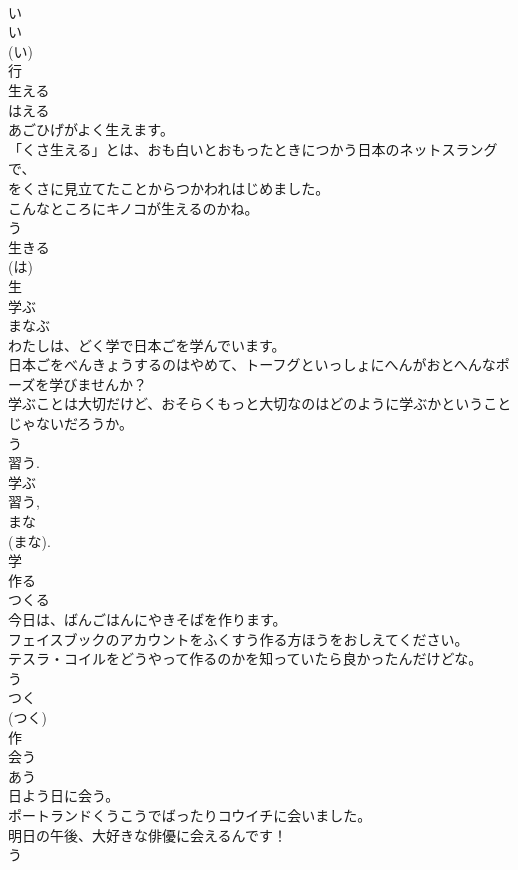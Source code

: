 \documentclass[8pt]{extreport}
\begin{document}
\begin{CJK}{UTF8}{min}
\\	い 
\\	い 
\\	(い) 
\\	行	
\\	生える	
\\	はえる	
\\	あごひげがよく生えます。	
\\	「くさ生える」とは、おも白いとおもったときにつかう日本のネットスラングで、
\\	をくさに見立てたことからつかわれはじめました。	
\\	こんなところにキノコが生えるのかね。	
\\	う 
\\	生きる 
\\	(は) 
\\	生	
\\	学ぶ	
\\	まなぶ	
\\	わたしは、どく学で日本ごを学んでいます。	
\\	日本ごをべんきょうするのはやめて、トーフグといっしょにへんがおとへんなポーズを学びませんか？	
\\	学ぶことは大切だけど、おそらくもっと大切なのはどのように学ぶかということじゃないだろうか。	
\\	う 
\\	習う. 
\\	学ぶ 
\\	習う, 
\\	まな 
\\	(まな). 
\\	学	
\\	作る	
\\	つくる	
\\	今日は、ばんごはんにやきそばを作ります。	
\\	フェイスブックのアカウントをふくすう作る方ほうをおしえてください。	
\\	テスラ・コイルをどうやって作るのかを知っていたら良かったんだけどな。	
\\	う 
\\	つく 
\\	(つく) 
\\	作	
\\	会う	
\\	あう	
\\	日よう日に会う。	
\\	ポートランドくうこうでばったりコウイチに会いました。	
\\	明日の午後、大好きな俳優に会えるんです！	
\\	う 

\end{CJK}
\end{document}
